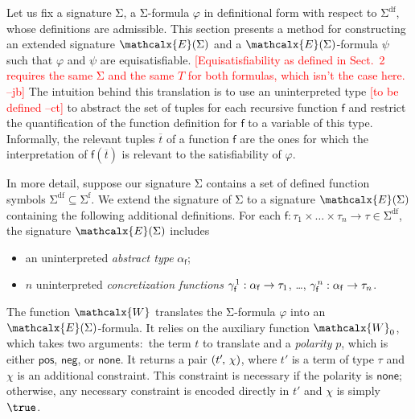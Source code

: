 \documentclass[runningheads,a4paper]{llncs}
\newcommand{\con}[1]{\mathsf{#1}}
\renewcommand\vec[1]{\overline{#1}}
\let\oldSigma=\Sigma
\def\Sigma{\mathrm{\oldSigma}}
\newcommand{\conv}{\mathcalx{W}}
\newcommand{\sfuns}[1]{#1^\mathrm{f}}
\newcommand{\sfundefs}[1]{#1^\mathrm{df}}
\newcommand{\pnone}{\con{none}}
\newcommand{\ptrue}{\con{pos}}
\newcommand{\pfalse}{\con{neg}}
\newcommand\concret{\gamma} %
\newcommand{\farg}[1]{\concret_{#1}}
\newcommand{\fargx}[2]{\concret^{\vthinspace#2}_{#1}}
\newcommand{\fargsort}[1]{\alpha_{#1}}
\newcommand{\extendsig}[1]{\mathcalx{E}( #1 )}
\newcommand{\rem}[1]{\textcolor{red}{[#1]}}
\newcommand{\jb}[1]{\rem{#1 --jb}}
\newcommand{\ct}[1]{\rem{#1 --ct}}
\newcommand{\negvthinspace}{\kern-0.083333em}
\newcommand{\vthinspace}{\kern+0.083333em}
\begin{document}
Let us fix a signature $\Sigma$, a $\Sigma$-formula
$\varphi$ in definitional form with respect to $\sfundefs{\Sigma}$,
whose definitions are admissible.
This section presents a method for constructing an extended signature
$\extendsig{ \Sigma }$ and a $\extendsig{ \Sigma }$-formula $\psi$ such that
$\varphi$ and $\psi$ are equisatisfiable.
\jb{Equisatisfiability as defined in Sect.\ 2 requires the same $\Sigma$ and
the same $T$ for both formulas, which isn't the case here.}
The intuition behind this translation
is to use an uninterpreted type \ct{to be defined} to abstract the set of
 tuples for each recursive function $\con{f}$ and restrict the
quantification of the function definition for $\con{f}$ to a variable of this
type. Informally, the relevant tuples $\vec t$ of a function $\con{f}$ are the
ones for which the interpretation of $\con{f}( \vec t )$ is relevant to the
satisfiability of $\varphi$.

In more detail, 
suppose our signature $\Sigma$ contains a set of defined function symbols $\sfundefs{\Sigma} \subseteq \sfuns{\Sigma}$.
We extend the signature of $\Sigma$ to a signature $\extendsig{\Sigma}$ containing the following additional definitions.
For each $\con{f} : \tau_1 \times \ldots \times \tau_n \rightarrow \tau \in \sfundefs{\Sigma}$,
the signature $\extendsig{\Sigma}$ includes
\begin{itemize}
\item an uninterpreted \emph{abstract type} $\fargsort{\con{f}}$;
\item $n$ uninterpreted \emph{concretization functions} $\fargx{\con{f}}{1} : \fargsort{\con{f}} \rightarrow \tau_1$, \ldots, $\fargx{\con{f}}{n} : \fargsort{\con{f}} \rightarrow \tau_n$.
\end{itemize}

The function $\conv$ translates the $\Sigma$-formula
$\varphi$ into an $\extendsig{\Sigma}$-formula. It relies
on the auxiliary function $\conv_0$, which takes two arguments:\ the term $t$
to translate and a \emph{polarity} $p$, which is either $\ptrue$, $\pfalse$, or
$\pnone$. It returns a pair $( t'\negvthinspace,\, \chi )$, where $t'$ is a term of
type $\tau$ and $\chi$ is an additional constraint.
This constraint is necessary if the polarity is $\pnone$; otherwise, any necessary
constraint is encoded directly in $t'$ and $\chi$ is simply $\true$.
\end{document}
